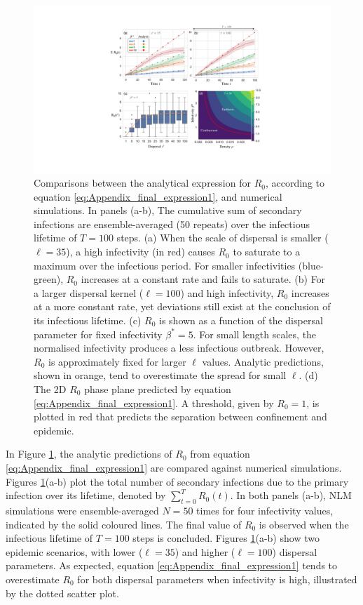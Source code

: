 \begin{figure}
    \centering
    \includegraphics[scale=0.475]{chapter5/figures/fig3b-R0-analytic.pdf}
    \caption{Comparisons between the analytical expression for $R_0$, according to equation \ref{eq:Appendix_final_expression1}, and numerical simulations.
    In panels (a-b), The cumulative sum of secondary infections are ensemble-averaged (50 repeats) over the infectious lifetime of $T=100$ steps.
    (a) When the scale of dispersal is smaller ($\ell=35$), a high infectivity (in red) causes $R_0$ to saturate to a maximum over the infectious period.
    For smaller infectivities (blue-green), $R_0$ increases at a constant rate and fails to saturate.
    (b) For a larger dispersal kernel ($\ell=100$) and high infectivity, $R_0$ increases at a more constant rate, 
    yet deviations still exist at the conclusion of its infectious lifetime.
    (c) $R_0$ is shown as a function of the dispersal parameter for fixed infectivity $\beta^*=5$. For small length scales, the normalised infectivity produces a less infectious outbreak. However, $R_0$ is approximately fixed for larger $\ell$ values. Analytic predictions, shown in orange, tend to overestimate the spread for small $\ell$.
    (d) The 2D $R_0$ phase plane predicted by equation \ref{eq:Appendix_final_expression1}. A threshold, given by $R_0=1$, is plotted in red that predicts the separation between confinement and epidemic.}
    \label{fig:R0-analytic-vs-sims}
\end{figure}

In Figure \ref{fig:R0-analytic-vs-sims}, the analytic predictions of $R_0$ from equation \ref{eq:Appendix_final_expression1} are compared against numerical simulations. 
Figures \ref{fig:R0-analytic-vs-sims}(a-b) plot the total number of secondary infections due to the primary infection over its lifetime, denoted by $\sum_{t=0}^T R_0(t)$.
In both panels (a-b), NLM simulations were ensemble-averaged $N=50$ times for four infectivity values, indicated by the solid coloured lines. 
The final value of $R_0$ is observed when the infectious lifetime of $T=100$ steps is concluded.
Figures \ref{fig:R0-analytic-vs-sims}(a-b) show two epidemic scenarios, with lower ($\ell=35$) and higher ($\ell=100$) dispersal parameters.
As expected, equation \ref{eq:Appendix_final_expression1} tends to overestimate $R_0$ for both dispersal parameters when infectivity is high, illustrated by the dotted scatter plot.

